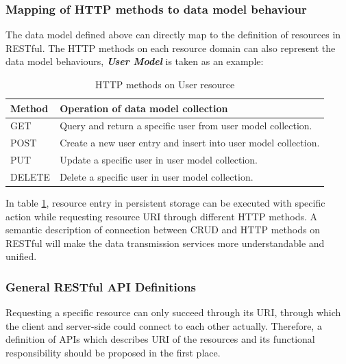 \subsubsection{ Mapping of HTTP methods to data model behaviour }
The data model defined above can directly map to the definition of resources in RESTful. The HTTP methods on each resource domain can also represent the data model behaviours, \textbf{\textit{User Model}} is taken as an example: 
\begin{table}[!htbp]
\centering
\begin{tabularx}{\textwidth}{@{}lX@{}}
\toprule
Method        & {Operation of data model collection }                            \\ \midrule
GET           & {Query and return a specific user from user model collection.}   \\
POST          & {Create a new user entry and insert into user model collection.} \\
PUT           & {Update a specific user in user model collection.}               \\
DELETE        & {Delete a specific user in user model collection.}               \\ \bottomrule
\end{tabularx}
\caption{HTTP methods on User resource}
\label{table:http-method-on-user-resource}
\end{table}

In table \ref{table:http-method-on-user-resource}, resource entry in persistent storage can be executed with specific action while requesting resource URI through different HTTP methods. A semantic description of connection between \gls{CRUD} and HTTP methods on RESTful will make the data transmission services more understandable and unified.

\subsubsection{ General RESTful API Definitions }

Requesting a specific resource can only succeed through its \gls{URI}, through which the client and server-side could connect to each other actually. Therefore, a definition of APIs which describes \gls{URI} of the resources and its functional responsibility should be proposed in the first place.


